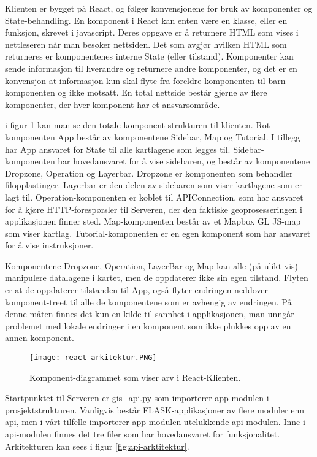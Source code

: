 Klienten er bygget på React, og følger konvensjonene for bruk av komponenter og State-behandling. En komponent i React kan enten være en klasse, eller en funksjon, skrevet i javascript. Deres oppgave er å returnere HTML som vises i nettleseren når man besøker nettsiden. Det som avgjør hvilken HTML som returneres er komponentenes interne State (eller tilstand). Komponenter kan sende informasjon til hverandre og returnere andre komponenter, og det er en konvensjon at informasjon kun skal flyte fra foreldre-komponenten til barn-komponenten og ikke motsatt. En total nettside består gjerne av flere komponenter, der hver komponent har et ansvarsområde.

i figur \ref{fig:react-arkitektur} kan man se den totale komponent-strukturen til klienten. Rot-komponenten App består av komponentene Sidebar, Map og Tutorial. I tillegg har App ansvaret for State til alle kartlagene som legges til. Sidebar-komponenten har hovedansvaret for å vise sidebaren, og består av komponentene Dropzone, Operation og Layerbar. Dropzone er komponenten som behandler filopplastinger. Layerbar er den delen av sidebaren som viser kartlagene som er lagt til. Operation-komponenten er koblet til APIConnection, som har ansvaret for å kjøre HTTP-forespørsler til Serveren, der den faktiske geoprosesseringen i applikasjonen finner sted. Map-komponenten består av et Mapbox GL JS-map som viser kartlag. Tutorial-komponenten er en egen komponent som har ansvaret for å vise instruksjoner.

Komponentene Dropzone, Operation, LayerBar og Map kan alle (på ulikt vis) manipulere datalagene i kartet, men de oppdaterer ikke sin egen tilstand. Flyten er at de oppdaterer tilstanden til App, også flyter endringen neddover komponent-treet til alle de komponentene som er avhengig av endringen. På denne måten finnes det kun en kilde til sannhet i applikasjonen, man unngår problemet med lokale endringer i en komponent som ikke plukkes opp av en annen komponent.

\begin{figure}[h]
    \center
    \texttt{[image: react-arkitektur.PNG]}
    \caption{Komponent-diagrammet som viser arv i React-Klienten.}
    \label{fig:react-arkitektur}
\end{figure}

Startpunktet til Serveren er gis\_api.py som importerer app-modulen i prosjektstrukturen. Vanligvis består FLASK-applikasjoner av flere moduler enn api, men i vårt tilfelle importerer app-modulen utelukkende api-modulen. Inne i api-modulen finnes det tre filer som har hovedansvaret for funksjonalitet. Arkitekturen kan sees i figur \ref{fig:api-arktitektur}.

